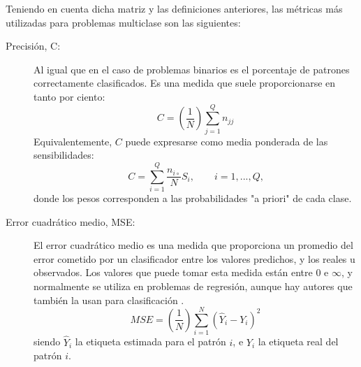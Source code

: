 Teniendo en cuenta dicha matriz y las definiciones anteriores, las métricas más utilizadas
para problemas multiclase son las siguientes:
\begin{description}
	\item[Precisión, C:]  Al igual que en el caso de problemas binarios
	es el porcentaje de patrones correctamente clasificados. Es una medida que suele
	proporcionarse en tanto por ciento:
	\begin{displaymath}
	C=\left( \frac{1}{N}\right) \sum_{j=1}^Q n_{jj}
	\end{displaymath}
	Equivalentemente, $C$ puede expresarse como media ponderada de las
	sensibilidades:
	\begin{equation}\label{CenbaseS}
	C=\sum_{i=1}^Q \frac{n_{i\circ}}{N} S_{i}, \qquad i=1,...,Q\text{,}
	\end{equation}
	donde los pesos corresponden a las probabilidades "a priori" de cada clase.
	\item[Error cuadrático medio, MSE:] El error cuadrático
	medio es una medida que
	proporciona un promedio del error cometido por un clasificador entre los valores
	predichos, y los reales u observados. Los valores que puede tomar esta medida están
	entre 0 e $\infty$, y normalmente se utiliza en problemas de regresión, aunque hay
	autores que también la usan para clasificación \cite{Abbass2001,Abbass2002a}.
	\begin{displaymath}
	MSE=\left(\frac{1}{N}\right)\sum_{i=1}^N\left(\hat{Y}_{i}-Y_{i}\right)^2
	\end{displaymath}
	siendo $\hat{Y}_{i}$ la etiqueta estimada para el patrón $i$, e $Y_{i}$ la etiqueta real
	del	patrón $i$.


\end{description}
